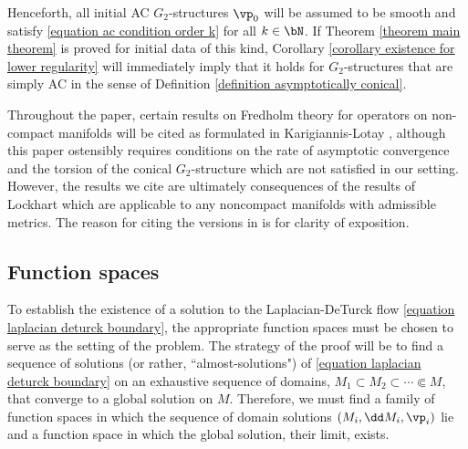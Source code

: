 \documentclass[hidelinks, 12pt, oneside, reqno]{amsart}
\begin{document}
\begin{rmk}\label{remark assumption of smoothness}
Henceforth, all initial AC $G_2$-structures $\vp_0$ will be assumed to be smooth and satisfy \eqref{equation ac condition order k} for all $k \in \bN$. If Theorem \ref{theorem main theorem} is proved for initial data of this kind, Corollary \ref{corollary existence for lower regularity} will immediately imply that it holds for $G_2$-structures that are simply AC in the sense of Definition \ref{definition asymptotically conical}. 
\end{rmk}

\begin{rmk}\label{remark lockhart vs KL}
Throughout the paper, certain results on Fredholm theory for operators on non-compact manifolds will be cited as formulated in Karigiannis-Lotay \cite{KarigiannisLotay}, although this paper ostensibly requires conditions on the rate of asymptotic convergence and the torsion of the conical $G_2$-structure which are not satisfied in our setting. However, the results we cite are ultimately consequences of the results of Lockhart \cite{Lockhart1987} which are applicable to any noncompact manifolds with admissible metrics. The reason for citing the versions in \cite{KarigiannisLotay} is for clarity of exposition. 
\end{rmk}

\subsection{Function spaces}

To establish the existence of a solution to the Laplacian-DeTurck flow \eqref{equation laplacian deturck boundary}, the appropriate function spaces must be chosen to serve as the setting of the problem. The strategy of the proof will be to find a sequence of solutions (or rather, ``almost-solutions") of \eqref{equation laplacian deturck boundary} on an exhaustive sequence of domains, $M_1 \subset M_2 \subset \cdots \Subset M$, that converge to a global solution on $M$. Therefore, we must find a family of function spaces in which the sequence of domain solutions $(M_i, \dd M_i, \vp_i)$ lie and a function space in which the global solution, their limit, exists.
\end{document}
